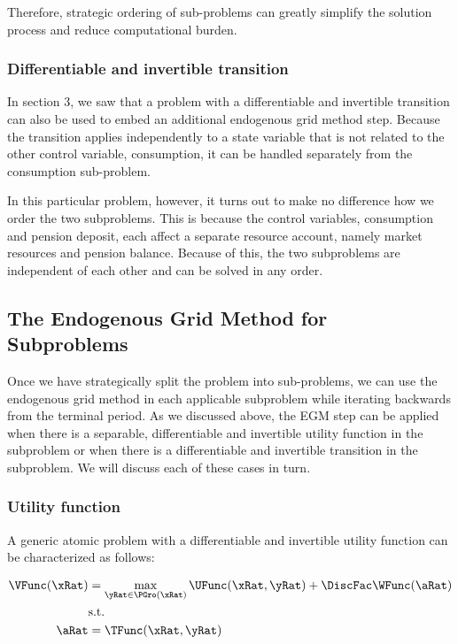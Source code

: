 \documentclass[\econtexRoot/SequentialEGM]{subfiles}
\begin{document}
Therefore, strategic ordering of sub-problems can greatly simplify the solution process and reduce computational burden.


\subsubsection{Differentiable and invertible transition}

In section 3, we saw that a problem with a differentiable and invertible transition can also be used to embed an additional endogenous grid method step. Because the transition applies independently to a state variable that is not related to the other control variable, consumption, it can be handled separately from the consumption sub-problem.

In this particular problem, however, it turns out to make no difference how we order the two subproblems. This is because the control variables, consumption and pension deposit, each affect a separate resource account, namely market resources and pension balance. Because of this, the two subproblems are independent of each other and can be solved in any order.

\subsection{The Endogenous Grid Method for Subproblems}

Once we have strategically split the problem into sub-problems, we can use the endogenous grid method in each applicable subproblem while iterating backwards from the terminal period. As we discussed above, the EGM step can be applied when there is a separable, differentiable and invertible utility function in the subproblem or when there is a differentiable and invertible transition in the subproblem. We will discuss each of these cases in turn.

\subsubsection{Utility function}

A generic atomic problem with a differentiable and invertible utility function can be characterized as follows:

\begin{equation}
    \begin{split}
        \VFunc(\xRat) &  = \max_{\yRat  \in \PGro(\xRat)} \UFunc(\xRat, \yRat) + \DiscFac \WFunc(\aRat) \\
        & \text{s.t.} \\
        \aRat & = \TFunc(\xRat,\yRat)
    \end{split}
\end{equation}
\end{document}
